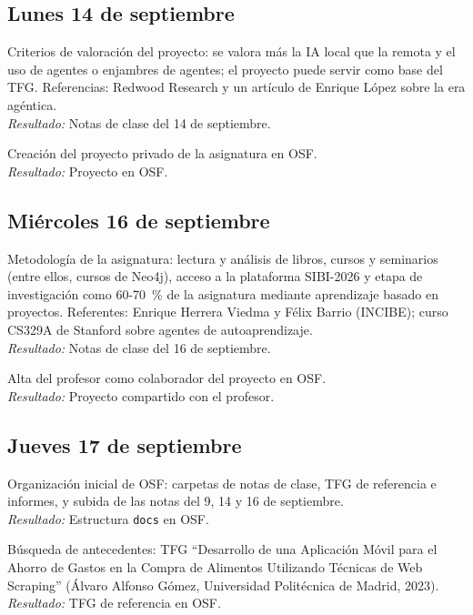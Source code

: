 \documentclass[11pt,a4paper]{article}
\newcommand{\actividad}[3]{\item[\textbf{[#1]}] #2 \\ \textit{Resultado:} #3}
\begin{document}
	\subsection*{Lunes 14 de septiembre}
	\begin{description}[leftmargin=0pt, itemsep=6pt]
		\actividad{Clase}{Criterios de valoración del proyecto: se valora más la IA local que la remota y el uso de agentes o enjambres de agentes; el proyecto puede servir como base del TFG. Referencias: Redwood Research y un artículo de Enrique López sobre la era agéntica.}{Notas de clase del 14 de septiembre.}
		\actividad{Tarea}{Creación del proyecto privado de la asignatura en OSF.}{Proyecto en OSF.}
	\end{description}

	\subsection*{Miércoles 16 de septiembre}
	\begin{description}[leftmargin=0pt, itemsep=6pt]
		\actividad{Clase}{Metodología de la asignatura: lectura y análisis de libros, cursos y seminarios (entre ellos, cursos de Neo4j), acceso a la plataforma SIBI-2026 y etapa de investigación como 60-70~\% de la asignatura mediante aprendizaje basado en proyectos. Referentes: Enrique Herrera Viedma y Félix Barrio (INCIBE); curso CS329A de Stanford sobre agentes de autoaprendizaje.}{Notas de clase del 16 de septiembre.}
		\actividad{Tarea}{Alta del profesor como colaborador del proyecto en OSF.}{Proyecto compartido con el profesor.}
	\end{description}

	\subsection*{Jueves 17 de septiembre}
	\begin{description}[leftmargin=0pt, itemsep=6pt]
		\actividad{Tarea}{Organización inicial de OSF: carpetas de notas de clase, TFG de referencia e informes, y subida de las notas del 9, 14 y 16 de septiembre.}{Estructura \texttt{docs} en OSF.}
		\actividad{Investigación}{Búsqueda de antecedentes: TFG ``Desarrollo de una Aplicación Móvil para el Ahorro de Gastos en la Compra de Alimentos Utilizando Técnicas de Web Scraping'' (Álvaro Alfonso Gómez, Universidad Politécnica de Madrid, 2023).}{TFG de referencia en OSF.}
	\end{description}
\end{document}
